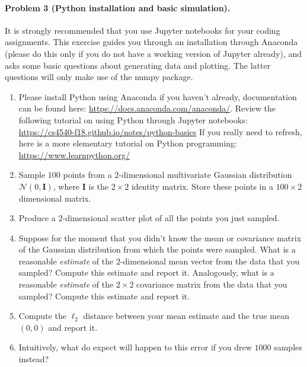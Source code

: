 \documentclass[11pt,twoside]{article}
\begin{document}
\paragraph{Problem 3 (Python installation and basic simulation).}
It is strongly recommended that you use Jupyter notebooks for your coding assignments. This exercise guides you through an installation through Anaconda (please do this only if you do not have a working version of Jupyter already), and asks some basic questions about generating data and plotting. The latter questions will only make use of the numpy package.
\begin{enumerate}[label=(\alph*)]
        \item Please install Python using Anaconda if you haven't already, documentation can be found here: \url{https://docs.anaconda.com/anaconda/}. 
 Review the following tutorial on using Python through Jupyter notebooks: \url{https://cs4540-f18.github.io/notes/python-basics} If you really need to refresh, here is a more elementary tutorial on Python programming: \url{https://www.learnpython.org/}
        \item Sample $100$ points from a $2$-dimensional multivariate Gaussian distribution $\mathcal{N}(0, \mathbf I)$, where $\mathbf I$ is the $2 \times 2$ identity matrix. Store these points in a $100 \times 2$ dimensional matrix.
        \item Produce a $2$-dimensional scatter plot of all the points you just sampled.
        \item Suppose for the moment that you didn't know the mean or covariance matrix of the Gaussian distribution from which the points were sampled. What is a reasonable \emph{estimate} of the $2$-dimensional mean vector from the data that you sampled? Compute this estimate and report it. Analogously, what is a reasonable \emph{estimate} of the $2 \times 2$ covariance matrix from the data that you sampled? Compute this estimate and report it.
        \item Compute the $\ell_2$ distance between your mean estimate and the true mean $(0, 0)$ and report it.
        \item Intuitively, what do expect will happen to this error if you drew $1000$ samples instead?
\end{enumerate}
\end{document}
